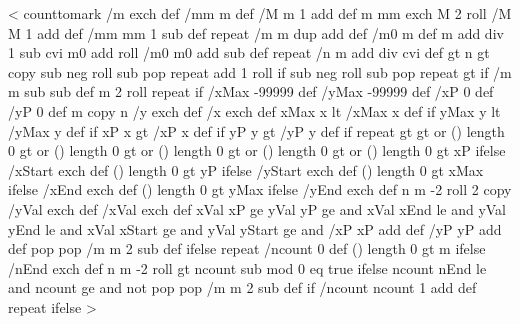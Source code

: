 <{%
  counttomark /m exch def
  \ifPsk@xyValues\else %
    /mm m def
    /M m 1 add def
    m { mm exch M 2 roll /M M 1 add def /mm mm 1 sub def } repeat
    /m m dup add def
  \fi
  \ifPst@ChangeOrder
    /m0 m def
    m \psk@plotNoMax{} add div 1 sub cvi {
      m0 \psk@plotNoMax{} add roll /m0 m0 \psk@plotNoMax{} add sub def
    } repeat
  \fi
  /n m \psk@plotNoMax{} add div cvi def
  \psk@plotNoMax{} gt {%
    n {
      \psk@plotNoTwo{} gt {
        \psk@plotNoMax\space copy
        \psk@plotNoMax\space \psk@plotNoTwo{} sub neg roll %
        \psk@plotNoMax{} sub { pop } repeat %
        \psk@plotNoMax{} add 1 roll } if
      \psk@plotNoMax\space \psk@plotNo{} sub neg roll %
      \psk@plotNoMax{} sub { pop } repeat %
      \psk@plotNoTwo{} gt {
          \psk@plotNoTwoFunc\space } if %
      /m m \psk@plotNoMax{} sub sub def
      m 2 roll
    } repeat
  } if %
  /xMax -99999 def /yMax -99999 def
  /xP 0 def /yP 0 def
  m copy
  n {
    /y exch def /x exch def
    xMax x lt { /xMax x def } if
    yMax y lt {/yMax y def } if
    xP x gt { /xP x def } if
    yP y gt { /yP y def } if
  } repeat
  \psk@xStep{} gt \psk@yStep{} gt or (\psk@xStart) length 0 gt or
  (\psk@yStart) length 0 gt or (\psk@xEnd) length 0 gt or (\psk@yEnd) length 0 gt or {
%
    (\psk@xStart) length 0 gt {\psk@xStart\space }{ xP } ifelse /xStart exch def
    (\psk@yStart) length 0 gt {\psk@yStart\space }{ yP } ifelse /yStart exch def
    (\psk@xEnd) length 0 gt { \psk@xEnd\space }{ xMax } ifelse /xEnd exch def
    (\psk@yEnd) length 0 gt { \psk@yEnd\space }{ yMax } ifelse /yEnd exch def
    n {
      m -2 roll
      2 copy /yVal exch def /xVal exch def
      xVal xP ge
      yVal yP ge and
      xVal xEnd le and
      yVal yEnd le and
      xVal xStart ge and
      yVal yStart ge and {
        /xP xP \psk@xStep\space add def
        /yP yP \psk@yStep\space add def
      }{%
        pop pop
        /m m 2 sub def
      } ifelse
    } repeat
  }{%
    /ncount 0 def
    (\psk@nEnd) length 0 gt { \psk@nEnd\space }{ m } ifelse
    /nEnd exch def
    n {
      m -2 roll
      \psk@nStep{} gt {
        ncount \psk@nStart\space sub \psk@nStep\space mod 0 eq }{ true } ifelse
        ncount nEnd le and
        ncount \psk@nStart\space ge and not {
          pop pop
          /m m 2 sub def
        } if
        /ncount ncount 1 add def
      } repeat
  } ifelse
}>
%

